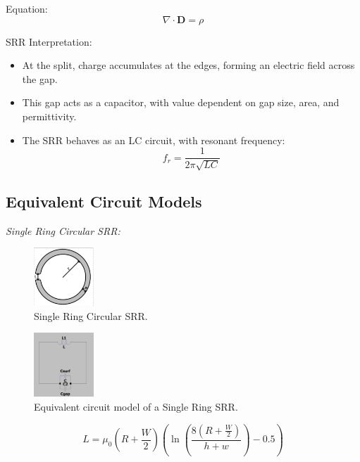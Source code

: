\documentclass[conference]{IEEEtran}
\begin{document}
Equation:
\[
\nabla \cdot \mathbf{D} = \rho
\]


SRR Interpretation:
\begin{itemize}
    \item At the split, charge accumulates at the edges, forming an electric field across the gap.
    \item This gap acts as a capacitor, with value dependent on gap size, area, and permittivity.
    \item The SRR behaves as an LC circuit, with resonant frequency:
    \[
    f_r = \frac{1}{2\pi\sqrt{LC}}
    \]
\end{itemize}


\subsection{Equivalent Circuit Models}

\textit{Single Ring Circular SRR:} 
\begin{figure}[h]
\centering
    \includegraphics[width=0.2\textwidth]{Images/Single_Ring_SRR.png}
    \caption{Single Ring Circular SRR.}
\end{figure}

\begin{figure}[h]
\centering
    \includegraphics[width=0.2\textwidth]{Images/Single_Circular_Equivalent_model.png}
    \caption{Equivalent circuit model of a Single Ring SRR.}
\end{figure}

\begin{equation}
    L = \mu_0 \left( R + \frac{W}{2} \right) \left( \ln\left( \frac{8\left( R + \frac{W}{2} \right)}{h + w} \right) - 0.5 \right)
    \end{equation}
    
\end{document}
